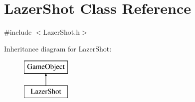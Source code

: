 \hypertarget{class_lazer_shot}{}\section{Lazer\+Shot Class Reference}
\label{class_lazer_shot}


{\ttfamily \#include $<$Lazer\+Shot.\+h$>$}

Inheritance diagram for Lazer\+Shot\+:\begin{figure}[H]
\begin{center}
\leavevmode
\includegraphics[height=2.000000cm]{class_lazer_shot}
\end{center}
\end{figure}

